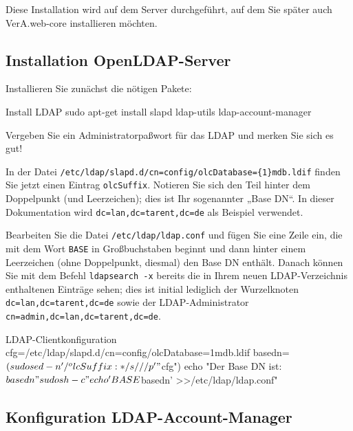 Diese Installation wird auf dem Server durchgeführt, auf dem Sie
später auch VerA.web-core installieren möchten.

\subsection{Installation OpenLDAP-Server}\label{subsec:setup-lam-slapd}

\begin{minipage}{\linewidth}
Installieren Sie zunächst die nötigen Pakete:

\begin{lstdump}{Install LDAP}
sudo apt-get install slapd ldap-utils ldap-account-manager
\end{lstdump}

Vergeben Sie ein Administratorpaßwort für das LDAP und merken
Sie sich es gut!
\end{minipage}

In der Datei \texttt{/etc/ldap/slapd.d/cn=config/olcDatabase=\{1\}mdb.ldif}
finden Sie jetzt einen Eintrag \texttt{olcSuffix}. Notieren Sie sich den
Teil hinter dem Doppelpunkt (und Leerzeichen); dies ist Ihr sogenannter
„Base DN“. In dieser Dokumentation wird \texttt{dc=lan,dc=tarent,dc=de} als
Beispiel verwendet.

Bearbeiten Sie die Datei \texttt{/etc/ldap/ldap.conf} und fügen Sie eine
Zeile ein, die mit dem Wort \texttt{BASE} in Großbuchstaben beginnt und dann
hinter einem Leerzeichen (ohne Doppelpunkt, diesmal) den Base DN enthält.
Danach können Sie mit dem Befehl \texttt{ldapsearch -x} bereits die in
Ihrem neuen LDAP-Verzeichnis enthaltenen Einträge sehen; dies ist initial
lediglich der Wurzelknoten \texttt{dc=lan,dc=tarent,dc=de} sowie der
LDAP-Administrator \texttt{cn=admin,dc=lan,dc=tarent,dc=de}.

\begin{minipage}{\linewidth}
\begin{lstdump}{LDAP-Clientkonfiguration}
cfg=/etc/ldap/slapd.d/cn=config/olcDatabase={1}mdb.ldif
basedn=$(sudo sed -n '/^olcSuffix: */s///p' "$cfg")
echo "Der Base DN ist: $basedn"
sudo sh -c "echo 'BASE $basedn' >>/etc/ldap/ldap.conf"
\end{lstdump}
\end{minipage}

\subsection{Konfiguration LDAP-Account-Manager}\label{subsec:setup-lam-cfg}

